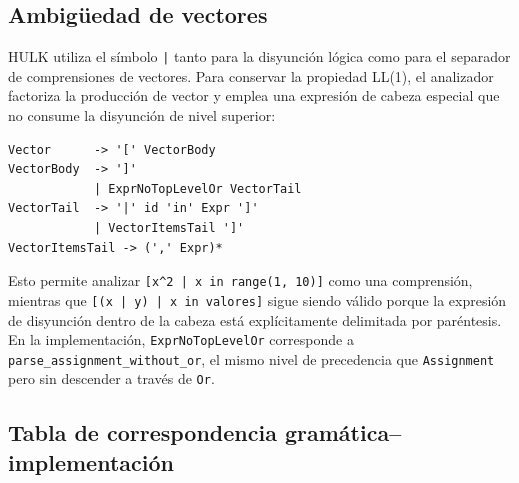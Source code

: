 \documentclass[12pt, a4paper]{article}
\begin{document}
\subsection{Ambigüedad de vectores}

HULK utiliza el símbolo \texttt{|} tanto para la disyunción lógica como para
el separador de comprensiones de vectores. Para conservar la propiedad LL(1),
el analizador factoriza la producción de vector y emplea una expresión de
cabeza especial que no consume la disyunción de nivel superior:

\begin{lstlisting}[language={}]
Vector      -> '[' VectorBody
VectorBody  -> ']'
            | ExprNoTopLevelOr VectorTail
VectorTail  -> '|' id 'in' Expr ']'
            | VectorItemsTail ']'
VectorItemsTail -> (',' Expr)*
\end{lstlisting}

Esto permite analizar \texttt{[x\^{}2 | x in range(1, 10)]} como una
comprensión, mientras que \texttt{[(x | y) | x in valores]} sigue siendo
válido porque la expresión de disyunción dentro de la cabeza está
explícitamente delimitada por paréntesis. En la implementación,
\texttt{ExprNoTopLevelOr} corresponde a \texttt{parse\_assignment\_without\_or},
el mismo nivel de precedencia que \texttt{Assignment} pero sin descender a
través de \texttt{Or}.

\subsection{Tabla de correspondencia gramática--implementación}
\end{document}

